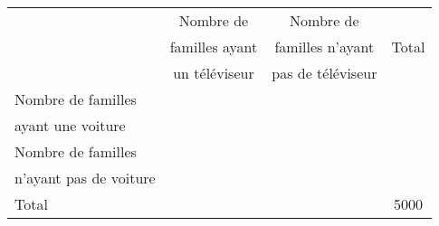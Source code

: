 \begin{tabular}{|@{\ }l@{\ }|@{\ }c@{\ }|@{\ }c@{\ }|@{$\qquad$ }c@{$\qquad$ }|}
	\hline
                       & Nombre de      & Nombre de         &       \\
                       & familles ayant & familles n'ayant  & Total \\
                       & un téléviseur  & pas de téléviseur &       \\ \hline
Nombre de familles     &                &                   &       \\
ayant une voiture      &                &                   &       \\ \hline
Nombre de familles     &                &                   &       \\
n'ayant pas de voiture &                &                   &       \\ \hline
Total                  &                &                   & 5000  \\ \hline
\end{tabular}